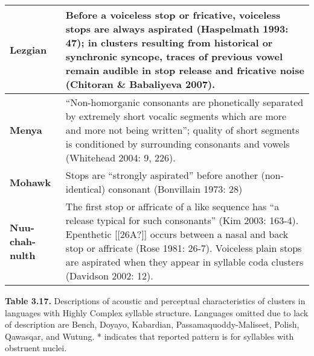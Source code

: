 \documentclass[12pt]{article}
\newenvironment{styleBody}{\renewcommand\baselinestretch{1.0}\setlength\leftskip{0in}\setlength\rightskip{0in plus 1fil}\setlength\parindent{0in}\setlength\parfillskip{0pt plus 1fil}\setlength\parskip{0in plus 1pt}\writerlistparindent\writerlistleftskip\leavevmode\normalfont\normalsize\fontsize{11pt}{13.2pt}\selectfont\mdseries\upshape\writerlistlabel\ignorespaces}{\unskip\vspace{0in plus 1pt}\par}
\newcommand\writerlistleftskip{}
\newcommand\writerlistparindent{}
\newcommand\writerlistlabel{}
\begin{document}
\begin{flushleft}
\begin{supertabular}{m{1.1893599in}m{5.14976in}}
{\bfseries Lezgian} &
Before a voiceless stop or fricative, voiceless stops are always aspirated (Haspelmath 1993: 47); in clusters resulting from historical or synchronic syncope, traces of previous vowel remain audible in stop release and fricative noise (Chitoran \& Babaliyeva 2007).\\\hline
{\bfseries Menya} &
“Non-homorganic consonants are phonetically separated by extremely short vocalic segments which are more and more not being written”; quality of short segments is conditioned by surrounding consonants and vowels (Whitehead 2004: 9, 226).\\\hline
{\bfseries Mohawk} &
Stops are “strongly aspirated” before another (non-identical) consonant (Bonvillain 1973: 28)\\\hline
{\bfseries Nuu-chah-nulth} &
{\fontsize{10pt}{12.0pt}\selectfont\mdseries\upshape The first stop or affricate of a like sequence has “a release typical for such consonants” (Kim 2003: 163-4). Epenthetic [[26A?]] occurs between a nasal and back stop or affricate (Rose 1981: 26-7). Voiceless plain stops are aspirated when they appear in syllable coda clusters (Davidson 2002: 12).}\\\hline
\end{supertabular}
\end{flushleft}
\begin{styleBody}
\textbf{Table 3.17.} Descriptions of acoustic and perceptual characteristics of clusters in languages with Highly Complex syllable structure. Languages omitted due to lack of description are Bench, Doyayo, Kabardian, Passamaquoddy-Maliseet, Polish, Qawasqar, and Wutung. * indicates that reported pattern is for syllables with obstruent nuclei.
\end{styleBody}
\end{document}
